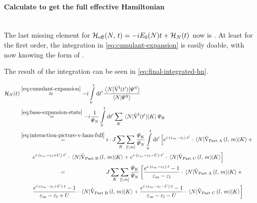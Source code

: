 \paragraph*{Calculate \HNOft to get the full effective Hamiltonian}\makebox{}\\

The last missing element for ${\mathcal{H}_\text{eff}}^{}({N},\,t) = -i E_0(N) t + \mathcal{H}_{N}(t)$ now is \HNOft.
At least for the first order, the integration in \autoref{eq:cumulant-expansion} is easily doable, with now knowing the form of .

The result of the integration can be seen in \autoref{eq:final-integrated-hn}.

\begin{equation}
    \label{eq:final-integrated-hn}
    \begin{split}
        \HNOft &\stackrel{\ref{eq:cumulant-expansion}}{\approx} -i \int\limits_0^t \mathrm{d}t' \frac{\bracketHelper{N}{\VhamiltonianOf[\interactionPicture]{t'}}{\picturePsi[\schroedingerPicture]{}}}{\braketHelper{N}{\picturePsi[\schroedingerPicture]{}}}\\
        &\stackrel{\ref{eq:base-expansion-state}}{=}
        -i \frac{1}{\psiN} \int\limits_0^t \mathrm{d}t' \lsum[K] \bracketHelper{N}{\VhamiltonianOf[\interactionPicture]{t'}}{K} \psiN[K]\\
        &\stackrel{\ref{eq:interaction-picture-v-ham-full}}{=}
        i \cdot J \lsum[K] \fullneighborsum{l}{m} \frac{\psiN[K]}{\psiN} \int\limits_0^t \mathrm{d}t' 
        \left[
            e^{i\cdot \left(\epsl[m]-\epsl\right)\cdot t'} \cdot 
            \bracketHelper{N}{
                \VhamiltonianPartA{l}{m} 
            }{K}
            + 
            \right.\\
            &\qquad
            \left.
            e^{i\cdot \left(\epsl[m]-\epsl + U\right)\cdot t'} \cdot 
            \bracketHelper{N}{
                \VhamiltonianPartB{l}{m}
            }{K}
            + 
            e^{i\cdot \left(\epsl[m]-\epsl - U\right)\cdot t'} \cdot 
            \bracketHelper{N}{
                \VhamiltonianPartC{l}{m} 
            }{K}
        \right]
        \\
        &\stackrel{\phantom{\ref{eq:interaction-picture-v-ham-full}}}{=}
        J \lsum[K] \fullneighborsum{l}{m} \frac{\psiN[K]}{\psiN}
        \left[
            \frac{e^{i\cdot \left(\epsl[m]-\epsl\right)\cdot t}-1}{\epsl[m]-\epsl} \cdot 
            \bracketHelper{N}{
                \VhamiltonianPartA{l}{m} 
            }{K}
            + 
            \right.\\
            &\qquad
            \left.
            \frac{
                e^{i\cdot \left(\epsl[m]-\epsl + U\right)\cdot t}-1
            }{\epsl[m]-\epsl + U}
             \cdot 
            \bracketHelper{N}{
                \VhamiltonianPartB{l}{m}
            }{K}
            + 
            \frac{
                e^{i\cdot \left(\epsl[m]-\epsl - U\right)\cdot t}-1
            }{\epsl[m]-\epsl - U}
             \cdot 
            \bracketHelper{N}{
                \VhamiltonianPartC{l}{m} 
            }{K}
        \right]
    \end{split}
\end{equation}

